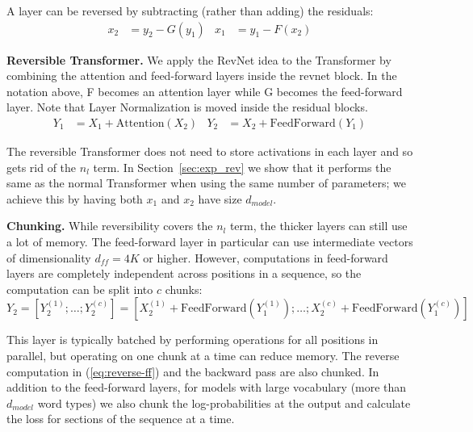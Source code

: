 \documentclass{article} \usepackage{iclr2020_conference,times}
\renewcommand{\paragraph}[1]{\textbf{#1}}
\begin{document}
A layer can be reversed by subtracting (rather than adding) the residuals:
\begin{align}\label{eq:reverse-ff}
    x_2 &= y_2 - G(y_1) &
    x_1 &= y_1 - F(x_2)
\end{align}


\paragraph{Reversible Transformer.}
We apply the RevNet idea to the Transformer by combining the attention and
feed-forward layers inside the revnet block. In the notation above,
F becomes an attention layer while G becomes the feed-forward layer. Note that Layer Normalization \citep{layernorm2016} is moved inside the residual blocks.
\begin{align}
    Y_1 &= X_1 + \mathrm{Attention}(X_2) &
    Y_2 &= X_2 + \mathrm{FeedForward}(Y_1)
\end{align}

The reversible Transformer does not need to store activations in each layer
and so gets rid of the $n_l$ term.  In Section~\ref{sec:exp_rev} we show that it performs the same as the normal Transformer when using  the same number of parameters; we achieve this by having both $x_1$ and $x_2$ have size $d_{model}$.

\paragraph{Chunking.}
While reversibility covers the $n_l$ term, the thicker layers can still use
a lot of memory. The feed-forward layer in particular can use intermediate vectors 
of dimensionality $d_{ff}=4K$ or higher. However, computations in feed-forward layers 
are completely independent across positions in a sequence, so the computation can be split 
into $c$ chunks:
\begin{equation}
    Y_2 = \left[Y_2^{(1)}; \ldots; Y_2^{(c)}\right] = \left[X_2^{(1)} + \mathrm{FeedForward}(Y_1^{(1)}); \ldots; X_2^{(c)} + \mathrm{FeedForward}(Y_1^{(c)})\right]
\end{equation}

This layer is typically batched by performing operations for all positions in parallel, but operating on one chunk at a time can reduce memory. The reverse computation in (\ref{eq:reverse-ff}) and the backward pass are also chunked.
In addition to the feed-forward layers, for models with large vocabulary (more than $d_{model}$ word types) we also chunk the log-probabilities at the output and calculate the loss for sections of the sequence at a time.
\end{document}

